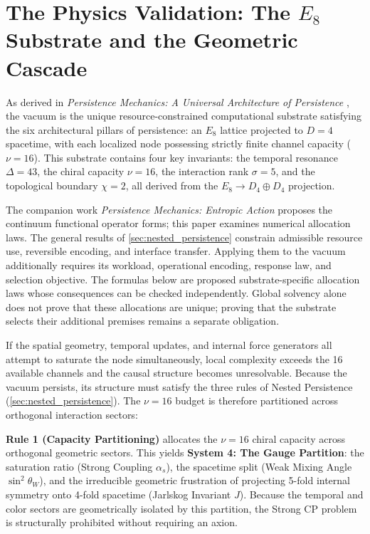 \section{The Physics Validation: The \texorpdfstring{$E_8$}{E8} Substrate and the Geometric Cascade}
\label{sec:physics_validation}

As derived in \textit{Persistence Mechanics: A Universal Architecture of Persistence} \cite{meyer_informational_2026}, the vacuum is the unique resource-constrained computational substrate satisfying the six architectural pillars of persistence: an $E_8$ lattice projected to $D=4$ spacetime, with each localized node possessing strictly finite channel capacity ($\nu = 16$). This substrate contains four key invariants: the temporal resonance $\Delta=43$, the chiral capacity $\nu=16$, the interaction rank $\sigma=5$, and the topological boundary $\chi=2$, all derived from the $E_8 \rightarrow D_4 \oplus D_4$ projection.

The companion work \textit{Persistence Mechanics: Entropic Action} \cite{meyer_ieaction_2026} proposes the continuum functional operator forms; this paper examines numerical allocation laws. The general results of \cref{sec:nested_persistence} constrain admissible resource use, reversible encoding, and interface transfer. Applying them to the vacuum additionally requires its workload, operational encoding, response law, and selection objective. The formulas below are proposed substrate-specific allocation laws whose consequences can be checked independently. Global solvency alone does not prove that these allocations are unique; proving that the substrate selects their additional premises remains a separate obligation.

If the spatial geometry, temporal updates, and internal force generators all attempt to saturate the node simultaneously, local complexity exceeds the 16 available channels and the causal structure becomes unresolvable. Because the vacuum persists, its structure must satisfy the three rules of Nested Persistence (\cref{sec:nested_persistence}). The $\nu = 16$ budget is therefore partitioned across orthogonal interaction sectors:

\textbf{Rule 1 (Capacity Partitioning)} allocates the $\nu = 16$ chiral capacity across orthogonal geometric sectors. This yields \textbf{System 4: The Gauge Partition}: the saturation ratio (Strong Coupling $\alpha_s$), the spacetime split (Weak Mixing Angle $\sin^2\theta_W$), and the irreducible geometric frustration of projecting 5-fold internal symmetry onto 4-fold spacetime (Jarlskog Invariant $J$). Because the temporal and color sectors are geometrically isolated by this partition, the Strong CP problem is structurally prohibited without requiring an axion.

